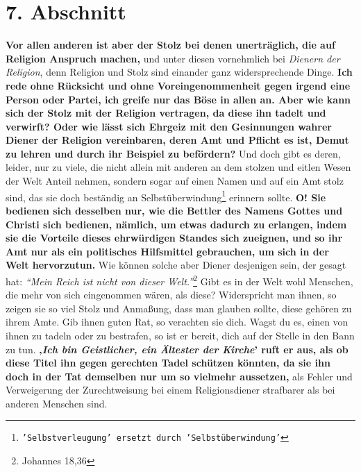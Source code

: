 \section{7. Abschnitt} \label{kap12_ab7}

 \label{ref:12_07_eitle_menschen_religion}
\textbf{Vor allen anderen ist aber der Stolz bei denen
unerträglich, die auf Religion
Anspruch machen,} und unter diesen vornehmlich bei \textit{Dienern der
Religion}, denn
Religion und Stolz sind einander ganz widersprechende Dinge. \textbf{Ich rede
ohne
Rücksicht und ohne Voreingenommenheit gegen irgend eine Person oder Partei, ich
greife nur das Böse in allen an. Aber wie kann sich der Stolz
mit der Religion
vertragen, da diese ihn tadelt und verwirft? Oder wie lässt sich Ehrgeiz mit den
Gesinnungen wahrer Diener der Religion vereinbaren, deren Amt und Pflicht es
ist,
Demut zu lehren und durch ihr Beispiel zu befördern?} Und doch gibt es deren,
leider, nur zu viele, die nicht allein mit anderen an dem stolzen und eitlen
Wesen der Welt Anteil nehmen, sondern sogar auf einen Namen und auf ein Amt
stolz sind, das sie doch beständig an
Selbstüberwindung\footnote{\texttt{'Selbstverleugung' ersetzt durch
'Selbstüberwindung'}}
erinnern sollte. 
\label{ref:12_07_eitle_menschen_religion_2} \textbf{O! Sie
bedienen sich desselben nur, wie die Bettler des Namens Gottes und Christi sich
bedienen, nämlich, um etwas dadurch zu erlangen, indem sie die Vorteile dieses
ehrwürdigen Standes sich zueignen, und so ihr Amt nur als ein politisches
Hilfsmittel gebrauchen, um sich in der Welt hervorzutun.} Wie können solche
aber
Diener desjenigen sein, der gesagt hat:
\textit{"`Mein Reich ist nicht von dieser
Welt."'}\footnote{Johannes 18,36}
Gibt es in der Welt wohl Menschen, die mehr von
sich eingenommen wären, als diese? Widerspricht man ihnen, so zeigen sie so viel
Stolz und Anmaßung, dass man glauben sollte, diese gehören zu ihrem Amte. Gib
ihnen guten Rat, so verachten sie dich. Wagst du es, einen von ihnen zu tadeln
oder zu bestrafen, so ist er bereit, dich auf der Stelle in den Bann
zu tun. \label{ref:12_07_eitle_menschen_geislicher}
\textbf{‚\textit{Ich bin Geistlicher, ein Ältester der Kirche}’ ruft er aus,
als ob diese Titel
ihn gegen gerechten Tadel schützen könnten, da sie ihn doch in der Tat
demselben nur um so vielmehr aussetzen,} als Fehler und Verweigerung der
Zurechtweisung bei einem Religionsdiener strafbarer als bei anderen Menschen
sind.

